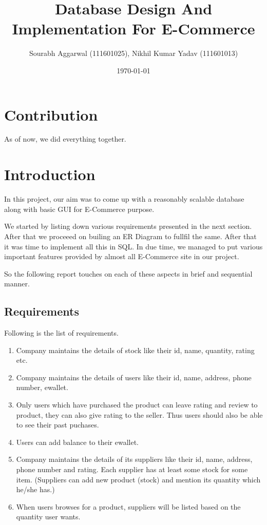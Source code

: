 \documentclass[a4paper,12pt]{article}
\begin{document}
\title{Database Design And Implementation For E-Commerce}
\author{\small{Sourabh Aggarwal (111601025), Nikhil Kumar Yadav (111601013)}}
\date{\today}
\maketitle
{}
\tableofcontents
\newpage
{}
\section{Contribution}
As of now, we did everything together.
\section{Introduction}
In this project, our aim was to come up with a reasonably scalable database along with basic GUI for E-Commerce purpose.

We started by listing down various requirements presented in the next section. After that we proceeed on builing an ER Diagram to fullfil the same. After that it was time to implement all this in SQL. In due time, we managed to put various important features provided by almost all E-Commerce site in our project. 

So the following report touches on each of these aspects in brief and sequential manner. 

\subsection{Requirements}
Following is the list of requirements.

\begin{enumerate}
\item Company maintains the details of stock like their id, name, quantity, rating etc.

\item Company maintains the details of users like their id, name, address, phone number, ewallet.

\item Only users which have purchased the product can leave rating and review to product, they can also give rating to the seller. Thus users should also be able to see their past puchases.

\item Users can add balance to their ewallet.

\item Company maintains the details of its suppliers like their id, name, address, phone number and rating. Each supplier has at least some stock for some item. (Suppliers can add new product (stock) and mention its quantity which he/she has.)

\item When users browses for a product, suppliers will be listed based on the quantity user wants.
\end{enumerate}
\end{document}
